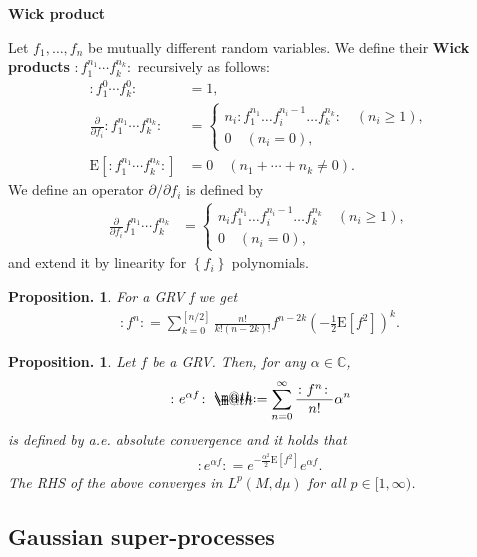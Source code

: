 \documentclass[openany, a4paper, oneside]{jsbook}
\makeatletter
\newcommand*{\defeq}{\mathrel{\rlap{%
\raisebox{0.3ex}{$\m@th\cdot$}}%
\raisebox{-0.3ex}{$\m@th\cdot$}}%
=}
\theoremstyle{break}
\theoremstyle{breakdefn}
\newtheorem{prop}[thm]{Proposition.}
\newcommand{\rbk}[1]{\left (#1\right)}
\newcommand{\sqbk}[1]{\left[#1\right]}
\newcommand{\cbk}[1]{\left\{#1\right\}}
\newcommand{\bbC}{\mathbb{C}}
\newcommand{\E}[1]{\rmE\sqbk{#1}}
\newcommand{\rmE}{\mathrm{E}}
\newcommand{\wick}[1]{\colon #1 \colon}
\makeatother
\begin{document}
\vspace{1em}

\textbf{Wick product}

Let $f_1, \dots, f_n$ be mutually different random variables.
We define their \textbf{Wick products} $\wick{f_1^{n_1} \cdots f_k^{n_k}}$ recursively as follows:
\begin{align}
 \wick{f_1^{0} \cdots f_k^{0}}
 &= 1, \\
 \frac{\partial}{\partial f_i} \wick{f_1^{n_1} \cdots f_k^{n_k}}
 &=
 \begin{cases}
  n_i \wick{f_1^{n_1} \dots f_i^{n_i - 1} \dots f_k^{n_k}} \quad (n_i \geq 1), \\
  0 \quad (n_i = 0),
 \end{cases} \\
 \E{ \wick{f_1^{n_1} \cdots f_k^{n_k}} }
 &= 0 \quad (n_1 + \cdots + n_k \neq 0).
\end{align}
We define an operator $\partial / \partial f_i$ is defined by
\begin{align}
 \frac{\partial}{\partial f_i} f_1^{n_1} \cdots f_k^{n_k}
 &=
 \begin{cases}
  n_i  f_1^{n_1} \dots f_i^{n_i - 1} \dots f_k^{n_k} \quad (n_i \geq 1), \\
  0 \quad (n_i = 0),
 \end{cases}
\end{align}
and extend it by linearity for $\cbk{f_i}$ polynomials.

\begin{prop}
 For a GRV f we get
 \begin{align}
  \wick{f^n}
  =
  \sum_{k=0}^{\sqbk{n/2}} \frac{n!}{k! (n-2k)!} f^{n - 2k} \rbk{- \frac{1}{2} \E{f^2}}^k.
 \end{align}
\end{prop}
\begin{prop}
 Let $f$ be a GRV.
 Then, for any $\alpha \in \bbC$,
 \begin{align}
  \wick{e^{\alpha f}}
  \defeq
  \sum_{n=0}^{\infty} \frac{\wick{f^n}}{n!} \alpha^n
 \end{align}
 is defined by a.e. absolute convergence and it holds that
 \begin{align}
  \wick{e^{\alpha f}}
  =
  e^{- \frac{\alpha^2}{2} \E{f^2}} e^{\alpha f}.
 \end{align}
 The RHS of the above converges in $L^p (M, d \mu)$ for all $p \in [1, \infty)$.
\end{prop}
\subsection{Gaussian super-processes}
\end{document}
